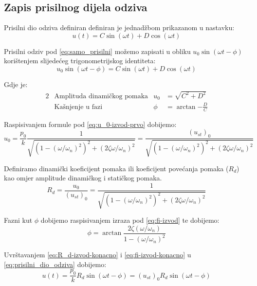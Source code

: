 \subsection{Zapis prisilnog dijela odziva}
Prisilni dio odziva definiran definiran je jednadžbom prikazanom u nastavku:
\begin{equation}\label{eq:samo_prisilni}
    u(t)=C\sin(\omega t) + D\cos(\omega t)
\end{equation}

Prisilni odziv pod \eqref{eq:samo_prisilni} možemo zapisati u obliku $u_0\sin(\omega t
- \phi)$ 
korištenjem slijedećeg trigonometrijskog identiteta:
\begin{equation}\label{eq:prisilni_dio_odziva}
    u_0\sin(\omega t - \phi) = C\sin(\omega t) + D\cos(\omega t)
\end{equation}

Gdje je:
\begin{alignat}{2}
    &\text{Amplituda dinamičkog pomaka} & u_0 &= \sqrt{C^2+D^2}\label{eq:u_0-izvod-prvo}\\
    &\text{Kašnjenje u fazi} & \phi &= \arctan{-\frac{D}{C}}\label{eq:fi-izvod}
\end{alignat}

Raspisivanjem formule pod \eqref{eq:u_0-izvod-prvo} dobijemo:
\begin{equation}\label{eq:u_0-izvod-raspisano}
    u_0 = \frac{p_0}{k}\frac{1}{\sqrt{(1-(\omega/\omega_n)^2)^2+(2\zeta\omega/\omega_n)^2}}
        = \frac{(u_{st})_0}{\sqrt{(1-(\omega/\omega_n)^2)^2+(2\zeta\omega/\omega_n)^2}}
\end{equation}

Definiramo dinamički koeficijent pomaka ili koeficijent povećanja pomaka ($R_d$) kao omjer
amplitude dinamičkog i statičkog pomaka.
\begin{equation}\label{eq:R_d-izvod-konacno}
    R_d = \frac{u_0}{(u_{st})_0}=\frac{1}{\sqrt{(1-(\omega/\omega_n)^2)^2+(2\zeta\omega/\omega_n)^2}}
\end{equation}

Fazni kut $\phi$ dobijemo raspisivanjem izraza pod \eqref{eq:fi-izvod} te dobijemo:
\begin{equation}\label{eq:fi-izvod-konacno}
    \phi = \arctan{\frac{2\zeta(\omega/\omega_n)}{1-(\omega/\omega_n)^2}}
\end{equation}

Uvrštavanjem \eqref{eq:R_d-izvod-konacno} i \eqref{eq:fi-izvod-konacno} u
\eqref{eq:prisilni_dio_odziva} dobijemo:
\begin{equation}
    u(t) = \frac{p_0}{k}R_d\sin(\omega t - \phi) = (u_{st})_0R_d\sin(\omega t - \phi)
\end{equation}

